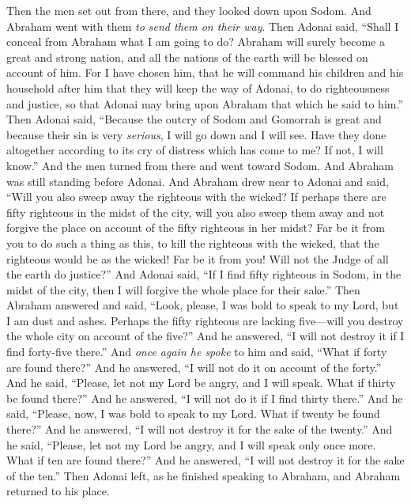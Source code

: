 \begin{biblechapter}
\verse Then the men set out from there, and they looked down upon Sodom. And Abraham went with them \textit{to send them on their way}.
\verse Then Adonai said, “Shall I conceal from Abraham what I am going to do?
\verse Abraham will surely become a great and strong nation, and all the nations of the earth will be blessed on account of him.
\verse For I have chosen him, that he will command his children and his household after him that they will keep the way of Adonai, to do righteousness and justice, so that Adonai may bring upon Abraham that which he said to him.”
\verse Then Adonai said, “Because the outcry of Sodom and Gomorrah is great and because their sin is very \textit{serious},
\verse I will go down and I will see. Have they done altogether according to its cry of distress which has come to me? If not, I will know.”
 And the men turned from there and went toward Sodom. And Abraham was still standing before Adonai.
\verse And Abraham drew near to Adonai and said, “Will you also sweep away the righteous with the wicked?
\verse If perhaps there are fifty righteous in the midst of the city, will you also sweep them away and not forgive the place on account of the fifty righteous in her midst?
\verse Far be it from you to do such a thing as this, to kill the righteous with the wicked, that the righteous would be as the wicked! Far be it from you! Will not the Judge of all the earth do justice?”
\verse And Adonai said, “If I find fifty righteous in Sodom, in the midst of the city, then I will forgive the whole place for their sake.”
\verse Then Abraham answered and said, “Look, please, I was bold to speak to my Lord, but I am dust and ashes.
\verse Perhaps the fifty righteous are lacking five—will you destroy the whole city on account of the five?” And he answered, “I will not destroy it if I find forty-five there.”
\verse And \textit{once again he spoke} to him and said, “What if forty are found there?” And he answered, “I will not do it on account of the forty.”
\verse And he said, “Please, let not my Lord be angry, and I will speak. What if thirty be found there?” And he answered, “I will not do it if I find thirty there.”
\verse And he said, “Please, now, I was bold to speak to my Lord. What if twenty be found there?” And he answered, “I will not destroy it for the sake of the twenty.”
\verse And he said, “Please, let not my Lord be angry, and I will speak only once more. What if ten are found there?” And he answered, “I will not destroy it for the sake of the ten.”
\verse Then Adonai left, as he finished speaking to Abraham, and Abraham returned to his place.
\end{biblechapter}

